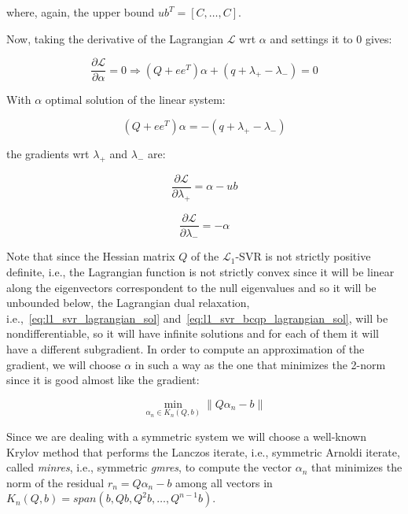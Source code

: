 where, again, the upper bound $ub^T = [C, \dots, C]$.

Now, taking the derivative of the Lagrangian $\mathcal{L}$ wrt $\alpha$ and settings it to 0 gives:

\begin{equation} \label{eq:l1_svr_bcqp_lagrangian_der_a}
	\frac{\partial \mathcal{L}}{\partial \alpha}=0\Rightarrow (Q + ee^T) \alpha + (q + \lambda_+ - \lambda_-) = 0
\end{equation}

With $\alpha$ optimal solution of the linear system:

\begin{equation} \label{eq:l1_svr_bcqp_lagrangian_sol}
    (Q + ee^T) \alpha = - (q + \lambda_+ - \lambda_-)
\end{equation}

the gradients wrt $\lambda_+$ and $\lambda_-$ are:

\begin{equation} \label{eq:l1_svr_bcqp_lagrangian_der_lp}
	\frac{\partial \mathcal{L}}{\partial \lambda_+}=\alpha - ub
\end{equation}

\begin{equation} \label{eq:l1_svr_bcqp_lagrangian_der_lm}
    \frac{\partial \mathcal{L}}{\partial \lambda_-}=-\alpha
\end{equation}

\bigskip

Note that since the Hessian matrix $Q$ of the $\mathcal{L}_1$-SVR is not strictly positive definite, i.e., the Lagrangian function is not strictly convex since it will be linear along the eigenvectors correspondent to the null eigenvalues and so it will be unbounded below, the Lagrangian dual relaxation, i.e.,~\ref{eq:l1_svr_lagrangian_sol} and~\ref{eq:l1_svr_bcqp_lagrangian_sol}, will be nondifferentiable, so it will have infinite solutions and for each of them it will have a different subgradient. In order to compute an approximation of the gradient, we will choose $\alpha$ in such a way as the one that minimizes the 2-norm since it is good almost like the gradient:

\begin{equation} \label{eq:svr_lagrangian_krylov_sol}
	\min_{\alpha_n \in K_n(Q, b)} \| Q \alpha_n - b \|
\end{equation}

Since we are dealing with a symmetric system we will choose a well-known Krylov method that performs the Lanczos iterate, i.e., symmetric Arnoldi iterate, called \emph{minres}, i.e., symmetric \emph{gmres}, to compute the vector $\alpha_n$ that minimizes the norm of the residual $r_n = Q \alpha_n - b$ among all vectors in $K_n(Q, b) = span(b, Qb, Q^2b, \dots, Q^{n-1}b)$.

